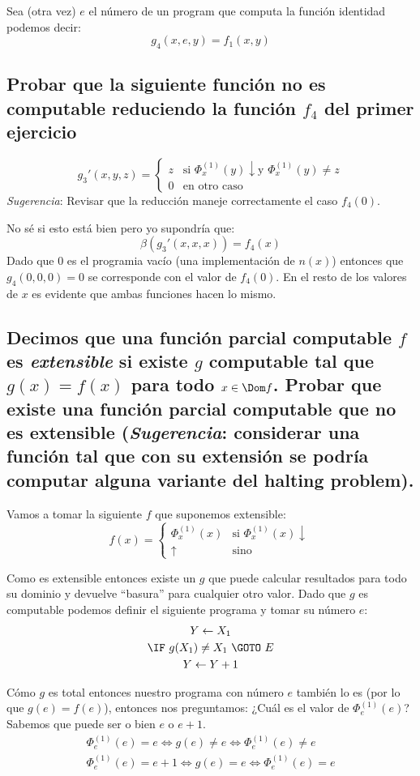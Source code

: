 \documentclass[fleqn, 11pt]{article}
\newcommand{\indef}{\uparrow}
\newcommand{\ddef}{\downarrow}
\newcommand{\into}{\leftarrow}
\begin{document}
Sea (otra vez) $e$ el número de un program que computa la función identidad
podemos decir:
\[
	g_4(x, e, y) = f_1(x, y)
\]

\subsection{Probar que la siguiente función no es computable reduciendo la
función $f_4$ del primer ejercicio}

\[
	g_3'(x, y, z) =
	\begin{cases}
		z & \text{si } \Phi^{(1)}_x(y) \ddef \text{y }
		    \Phi^{(1)}_x(y) \neq z \\
		0 & \text{en otro caso}
	\end{cases}
\]
\emph{Sugerencia}: Revisar que la reducción maneje correctamente el caso
$f_4(0)$.

No sé si esto está bien pero yo supondría que:
\[
	\beta(g_3'(x, x, x)) = f_4(x)
\] 
Dado que $0$ es el programia vacío (una implementación de $n(x)$) entonces que
$g_4(0, 0, 0) = 0$ se corresponde con el valor de $f_4(0)$. En el resto de los
valores de $x$ es evidente que ambas funciones hacen lo mismo.

\subsection{Decimos que una función parcial computable $f$ es \emph{extensible}
si existe $g$ computable tal que $g(x) = f(x)$ para todo $x \in \Dom f$. Probar
que existe una función parcial computable que no es extensible
(\emph{Sugerencia}: considerar una función tal que con su extensión se podría
computar alguna variante del halting problem).}

Vamos a tomar la siguiente $f$ que suponemos extensible:
\[
	f(x) =
	\begin{cases}
		\Phi^{(1)}_x(x) & \text{si } \Phi^{(1)}_x(x) \ddef \\
		\indef & \text{sino}
	\end{cases}
\]

Como es extensible entonces existe un $g$ que puede calcular resultados para
todo su dominio y devuelve ``basura'' para cualquier otro valor. Dado que $g$
es computable podemos definir el siguiente programa y tomar su número $e$:
\begin{gather*}
	Y \into X_1 \\
	\IF\ g(X_1) \neq X_1\ \GOTO\ E \\
	Y \into Y + 1
\end{gather*}

Cómo $g$ es total entonces nuestro programa con número $e$ también lo es (por
lo que $g(e) = f(e)$), entonces nos preguntamos: ¿Cuál es el valor de
$\Phi^{(1)}_e(e)$? Sabemos que puede ser o bien $e$ o $e + 1$.
\begin{align*}
	\Phi^{(1)}_e(e) = e \iff g(e) \neq e \iff \Phi^{(1)}_e(e) \neq e \\
	\Phi^{(1)}_e(e) = e + 1 \iff g(e) = e \iff \Phi^{(1)}_e(e) = e
\end{align*}
\end{document}
